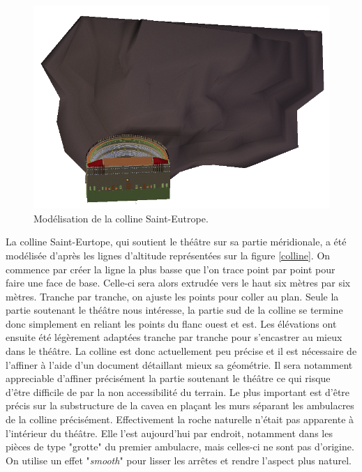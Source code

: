 \begin{figure}[!h]
	\centering
	\includegraphics[width=\textwidth]{images/modColline}
	\caption{Modélisation de la colline Saint-Eutrope.} 
	\label{modColline} 
\end{figure}

La colline Saint-Eurtope, qui soutient le théâtre sur sa partie méridionale, a été modélisée d'après les lignes d'altitude représentées sur la figure \ref{colline}. On commence par créer la ligne la plus basse que l'on trace point par point pour faire une face de base. Celle-ci sera alors extrudée vers le haut six mètres par six mètres. Tranche par tranche, on ajuste les points pour coller au plan. Seule la partie soutenant le théâtre nous intéresse, la partie sud de la colline se termine donc simplement en reliant les points du flanc ouest et est. Les élévations ont ensuite été légèrement adaptées tranche par tranche pour s'encastrer au mieux dans le théâtre. La colline est donc actuellement peu précise et il est nécessaire de l'affiner à l'aide d'un document détaillant mieux sa géométrie. Il sera notamment appreciable d'affiner précisément la partie soutenant le théâtre ce qui risque d'être difficile de par la non accessibilité du terrain. Le plus important est d'être précis sur la substructure de la  \gls{cavea} en plaçant les murs séparant les  \glspl{ambulacre} de la colline précisément. Effectivement la roche naturelle n'était pas apparente à l'intérieur du théâtre. Elle l'est aujourd'hui par endroit, notamment dans les pièces de type "grotte" du premier \gls{ambulacre}, mais celles-ci ne sont pas d'origine. On utilise un effet "\textit{smooth}" pour lisser les arrêtes et rendre l'aspect plus naturel.


